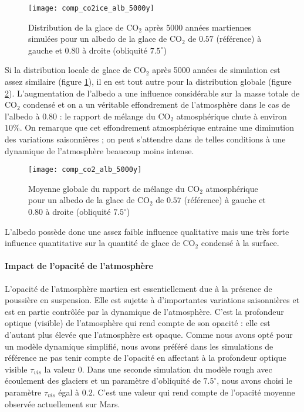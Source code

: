\documentclass[11pt,a4paper]{article}
\begin{document}
\begin{figure}[h!]
\begin{center}
\texttt{[image: comp\_co2ice\_alb\_5000y]}
\caption{Distribution de la glace de CO$_2$ après 5000 années martiennes simulées pour un albedo de la glace de CO$_2$ de $0.57$ (référence) à gauche et $0.80$ à droite (obliquité $7.5^\circ$)}
\label{comp_co2ice_alb_5000y}
\end{center}
\end{figure}

Si la distribution locale de glace de CO$_2$ après 5000 années de simulation est assez similaire (figure \ref{comp_co2ice_alb_5000y}), il en est tout autre pour la distribution globale (figure \ref{comp_co2_alb_5000y}). L'augmentation de l'albedo a une influence considérable sur la masse totale de CO$_2$ condensé et on a un véritable effondrement de l'atmosphère dans le cas de l'albedo à $0.80$ : le rapport de mélange du CO$_2$ atmosphérique chute à environ $10\%$. On remarque que cet effondrement atmosphérique entraine une diminution des variations saisonnières ; on peut s'attendre dans de telles conditions à une dynamique de l'atmosphère beaucoup moins intense. \\

\begin{figure}[h!]
\begin{center}
\texttt{[image: comp\_co2\_alb\_5000y]}
\caption{Moyenne globale du rapport de mélange du CO$_2$ atmosphérique pour un albedo de la glace de CO$_2$ de $0.57$ (référence) à gauche et $0.80$ à droite  (obliquité $7.5^\circ$)}
\label{comp_co2_alb_5000y}
\end{center}
\end{figure}

L'albedo possède donc une assez faible influence qualitative mais une très forte influence quantitative sur la quantité de glace de CO$_2$ condensé à la surface. \\

\paragraph{Impact de l'opacité de l'atmosphère \\}
L'opacité de l'atmosphère martien est essentiellement due à la présence de poussière en suspension. Elle est sujette à d'importantes variations saisonnières et est en partie contrôlée par la dynamique de l'atmosphère. C'est la profondeur optique (visible) de l'atmosphère qui rend compte de son opacité : elle est d'autant plus élevée que l'atmosphère est opaque. Comme nous avons opté pour un modèle dynamique simplifié, nous avons préféré dans les simulations de référence ne pas tenir compte de l'opacité en affectant à la profondeur optique visible $\tau_{vis}$ la valeur $0$. Dans une seconde simulation du modèle rough avec écoulement des glaciers et un paramètre d'obliquité de $7.5^\circ$, nous avons choisi le paramètre $\tau_{vis}$ égal à $0.2$. C'est une valeur qui rend compte de l'opacité moyenne observée actuellement sur Mars. \\
\end{document}
